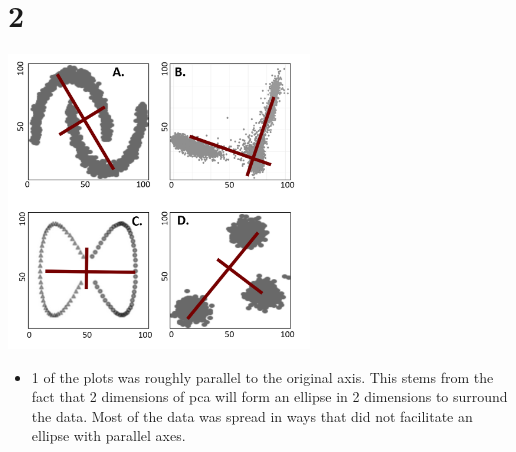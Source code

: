 \documentclass[11pt]{article}
\begin{document}
\section*{2}
\label{sec:org2e2cc01}
\begin{center}
\includegraphics[width=8cm]{2.png}
\end{center}
\begin{itemize}
\item 1 of the plots was roughly parallel to the original axis. This stems from the
fact that 2 dimensions of pca will form an ellipse in 2 dimensions to surround
the data. Most of the data was spread in ways that did not facilitate an
ellipse with parallel axes.
\end{itemize}
\end{document}

